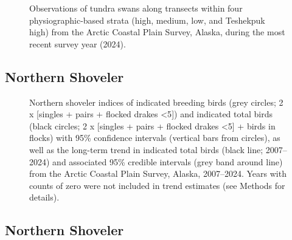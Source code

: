 \documentclass[
]{article}
\begin{document}
\begin{figure}


\caption{\label{fig-SWANmap}Observations of tundra swans along transects
within four physiographic-based strata (high, medium, low, and Teshekpuk
high) from the Arctic Coastal Plain Survey, Alaska, during the most
recent survey year (2024).}

\end{figure}%

\newpage{}

\subsection*{Northern Shoveler}\label{northern-shoveler}

\begin{figure}


\caption{\label{fig-NSHO}Northern shoveler indices of indicated breeding
birds (grey circles; 2 x {[}singles + pairs + flocked drakes
\textless5{]}) and indicated total birds (black circles; 2 x {[}singles
+ pairs + flocked drakes \textless5{]} + birds in flocks) with 95\%
confidence intervals (vertical bars from circles), as well as the
long-term trend in indicated total birds (black line; 2007--2024) and
associated 95\% credible intervals (grey band around line) from the
Arctic Coastal Plain Survey, Alaska, 2007--2024. Years with counts of
zero were not included in trend estimates (see Methods for details).}

\end{figure}%

\newpage{}

\subsection*{Northern Shoveler}\label{northern-shoveler-1}

\begingroup\fontsize{10}{12}\selectfont
\end{document}
